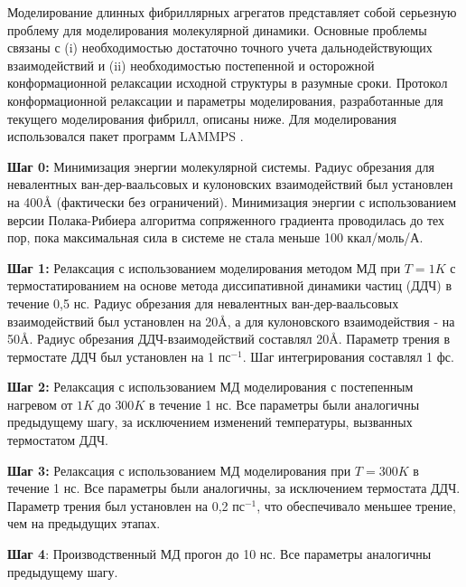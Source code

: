     Моделирование длинных фибриллярных агрегатов представляет собой серьезную проблему для моделирования молекулярной динамики. Основные проблемы связаны с (i) необходимостью достаточно точного учета дальнодействующих взаимодействий и (ii) необходимостью постепенной и осторожной конформационной релаксации исходной структуры в разумные сроки. Протокол конформационной релаксации и параметры моделирования, разработанные для текущего моделирования фибрилл, описаны ниже. Для моделирования использовался пакет программ LAMMPS \cite{plimpton_fast_1995}.
    
    \textbf{Шаг 0:} Минимизация энергии молекулярной системы. Радиус обрезания для невалентных ван-дер-ваальсовых и кулоновских взаимодействий был установлен на 400\AA{} (фактически без ограничений). Минимизация энергии с использованием версии Полака-Рибиера алгоритма сопряженного градиента проводилась до тех пор, пока максимальная сила в системе не стала меньше 100 ккал/моль/А.

    \textbf{Шаг 1:} Релаксация с использованием моделирования методом МД при $T=1K$ с термостатированием на основе метода диссипативной динамики частиц (ДДЧ) в течение 0,5 нс. Радиус обрезания для невалентных ван-дер-ваальсовых взаимодействий был установлен на 20\AA, а для кулоновского взаимодействия - на 50\AA. Радиус обрезания ДДЧ-взаимодействий составлял 20\AA. Параметр трения в термостате ДДЧ был установлен на 1 $пс^{-1}$. Шаг интегрирования составлял 1 фс.

    \textbf{Шаг 2:} Релаксация с использованием МД моделирования с постепенным нагревом от $1K$ до $300K$ в течение 1 нс. Все параметры были аналогичны предыдущему шагу, за исключением изменений температуры, вызванных термостатом ДДЧ.

    \textbf{Шаг 3:} Релаксация с использованием МД моделирования при $T = 300K$ в течение 1 нс. Все параметры были аналогичны, за исключением термостата ДДЧ. Параметр трения был установлен на 0,2 $пс^{-1}$, что обеспечивало меньшее трение, чем на предыдущих этапах.
    
    \textbf{Шаг 4}: Производственный МД прогон до 10 нс. Все параметры аналогичны предыдущему шагу.
    
